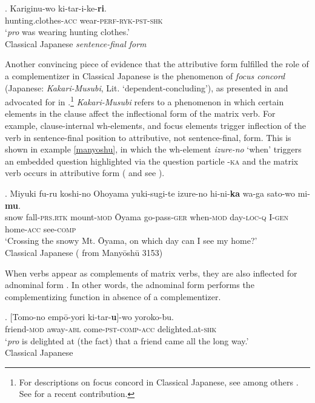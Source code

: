 \documentclass [output=book,colorlinks,citecolor=brown]{langscibook}
\begin{document}
\exg. Kariginu-wo ki-tar-i-ke-\textbf{ri}.\\
hunting.clothes-\textsc{acc} wear-\textsc{perf-ryk-pst-shk}\\
`\textit{pro} was wearing hunting clothes.’ \\ \null \hfill Classical Japanese \textit{sentence-final form} \label{keru}

Another convincing piece of evidence that the attributive form fulfilled the role of a complementizer in Classical Japanese is the phenomenon of \textit{focus concord} (Japanese: \textit{Kakari-Musubi}, Lit. `dependent-concluding’), as presented in \citet{kinsui:1995:iwayuru} and advocated for in \citet[ch. 3.5]{hiraiwa:2005:dimensions}.\footnote{For descriptions on focus concord in Classical Japanese, see among others \citet{morishige:1971:nihon,funagi:1987:kakari}. See \citet{narrog:2019:origin} for a recent contribution.} \textit{Kakari-Musubi} refers to a phenomenon in which certain elements in the clause affect the inflectional form of the matrix verb. For example, clause-internal wh-elements, and focus elements trigger inflection of the verb in sentence-final position to attributive, not sentence-final, form. This is shown in example \ref{manyoshu}, in which the wh-element \textit{izure-no} `when’ triggers an embedded question highlighted via the question particle -\textsc{ka} and the matrix verb occurs in attributive form (\citealt[125–127]{hiraiwa:2005:dimensions} and see \citealt{nomura:1995:ka}). %

\exg. Miyuki fu-ru koshi-no Ohoyama yuki-sugi-te izure-no hi-ni-\textbf{ka} wa-ga sato-wo mi-\textbf{mu}.\\
snow fall-\textsc{prs.rtk} mount-\textsc{mod} Ōyama go-pass-\textsc{ger} when-\textsc{mod} day-\textsc{loc-q} I-\textsc{gen} home-\textsc{acc} see-\textsc{comp}\\
`Crossing the snowy Mt. Ōyama, on which day can I see my home?' \\ \null \hfill Classical Japanese (\citealt[125]{hiraiwa:2005:dimensions} from Manyōshū 3153) \label{manyoshu}

When verbs appear as complements of matrix verbs, they are also inflected for adnominal form \citep[10–11]{kinsui:1995:iwayuru}. In other words, the adnominal form performs the complementizing function in absence of a complementizer. %

\exg. [Tomo-no empō-yori ki-tar-\textbf{u}]-wo yoroko-bu.\\
friend-\textsc{mod} away-\textsc{abl} come-\textsc{pst-comp}-\textsc{acc} delighted.at-\textsc{shk}\\
`\textit{pro} is delighted at (the fact) that a friend came all the long way.’ \\ \null \hfill Classical Japanese \citep[10]{kinsui:1995:iwayuru}
\end{document}

